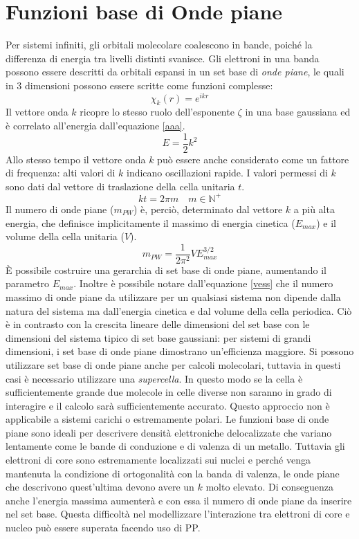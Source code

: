 \documentclass[oneside]{amsbook}
\numberwithin{section}{chapter}
\numberwithin{equation}{section}
\numberwithin{figure}{section}
\begin{document}
\section{Funzioni base di Onde piane  }
Per sistemi infiniti, gli orbitali molecolare coalescono in bande, poiché la differenza di energia tra livelli distinti svanisce. Gli elettroni in una banda possono essere descritti da orbitali espansi in un set base di \emph{onde piane},  le quali in $3$ dimensioni possono essere scritte come funzioni complesse:
\begin{equation}
\chi_k(r)= e^{ikr}
\end{equation}
Il vettore onda $k$ ricopre lo stesso ruolo dell'esponente $\zeta$ in una base gaussiana ed è correlato all'energia dall'equazione \ref{aaa}.
\begin{equation}
\label{aaa}
E=\frac{1}{2}k^2
\end{equation}
Allo stesso tempo il vettore onda $k$ può essere anche considerato come un fattore di frequenza: alti valori di $k$ indicano oscillazioni rapide. I valori permessi di $k$ sono dati dal vettore di traslazione della cella unitaria $t$. $$kt=2\pi m \quad m\in \mathbb{N}^+$$
Il numero di onde piane ($m_{PW}$) è, perciò, determinato dal vettore $k$ a più alta energia, che definisce implicitamente il massimo di energia cinetica ($E_{max}$) e il volume della cella unitaria ($V$).
\begin{equation}
\label{vess}
m_{PW}= \frac{1}{2\pi^2}V E_{max}^{3/2}
\end{equation}
\`E possibile costruire una gerarchia di set base di onde piane, aumentando il parametro $E_{max}$. Inoltre è possibile notare dall'equazione \ref{vess} che il numero massimo di onde piane da utilizzare per un qualsiasi sistema non dipende dalla natura del sistema ma dall'energia cinetica e dal volume della cella periodica. Ciò è in contrasto con la crescita lineare delle dimensioni del set base con le dimensioni del sistema tipico di set base gaussiani: per sistemi di grandi dimensioni, i set base di onde piane dimostrano un'efficienza maggiore.
Si possono utilizzare set base di onde piane anche per calcoli molecolari, tuttavia in questi casi è necessario utilizzare una \emph{supercella}. In questo modo se la cella è sufficientemente grande due molecole in celle diverse non saranno in grado di interagire e il calcolo sarà sufficientemente accurato. Questo approccio non è applicabile a sistemi carichi o estremamente polari.
Le funzioni base di onde piane sono ideali per descrivere densità elettroniche delocalizzate che variano lentamente come le bande di conduzione e di valenza di un metallo. Tuttavia gli elettroni di core sono estremamente localizzati sui nuclei e perché venga mantenuta la condizione di ortogonalità con la banda di valenza, le onde piane che descrivono quest'ultima devono avere un $k$ molto elevato. Di conseguenza anche l'energia massima aumenterà e con essa il numero di onde piane da inserire nel set base. Questa difficoltà nel modellizzare l'interazione tra elettroni di core e nucleo può essere superata facendo uso di PP.
\end{document}
